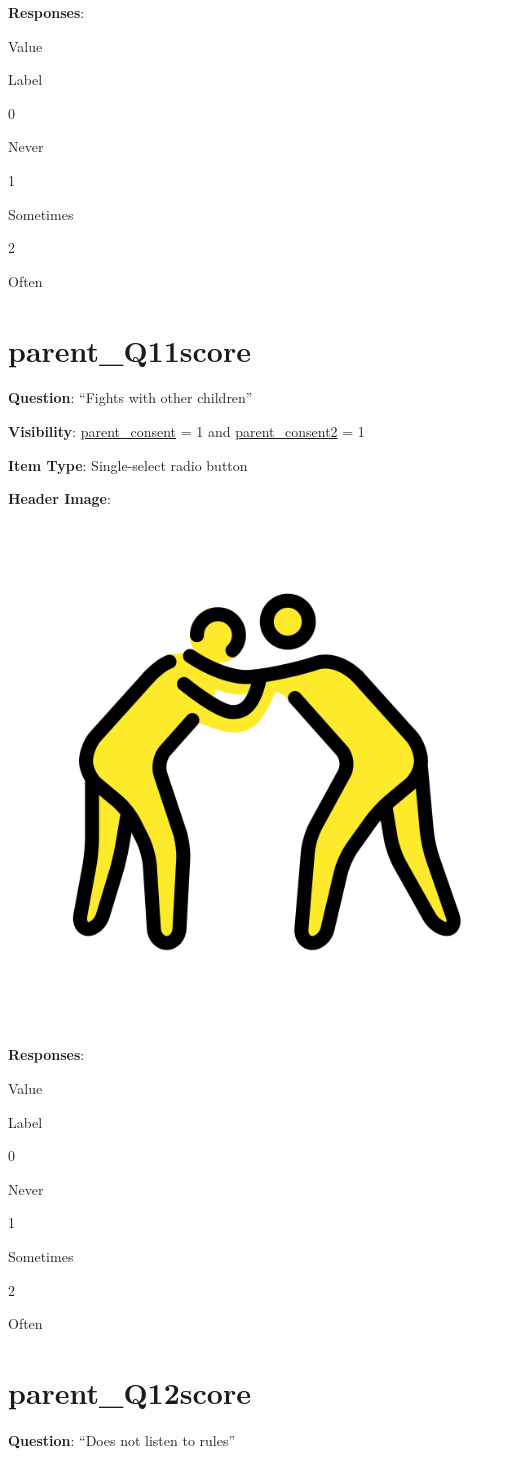\documentclass[]{book}
\begin{document}
\textbf{Responses}:

Value

Label

0

Never

1

Sometimes

2

Often

\hypertarget{parent_q11score}{%
\section{parent\_Q11score}\label{parent_q11score}}

\textbf{Question}: ``Fights with other children''

\textbf{Visibility}: \protect\hyperlink{parent_consent}{parent\_consent} = 1 and \protect\hyperlink{parent_consent2}{parent\_consent2} = 1

\textbf{Item Type}: Single-select radio button

\textbf{Header Image}:

\begin{flushleft}\includegraphics[width=0.33\linewidth]{downloadFigs4latex_HBN_PMHS_Codebook/parent_Q11score_headerImg} \end{flushleft}

\textbf{Responses}:

Value

Label

0

Never

1

Sometimes

2

Often

\hypertarget{parent_q12score}{%
\section{parent\_Q12score}\label{parent_q12score}}

\textbf{Question}: ``Does not listen to rules''
\end{document}
